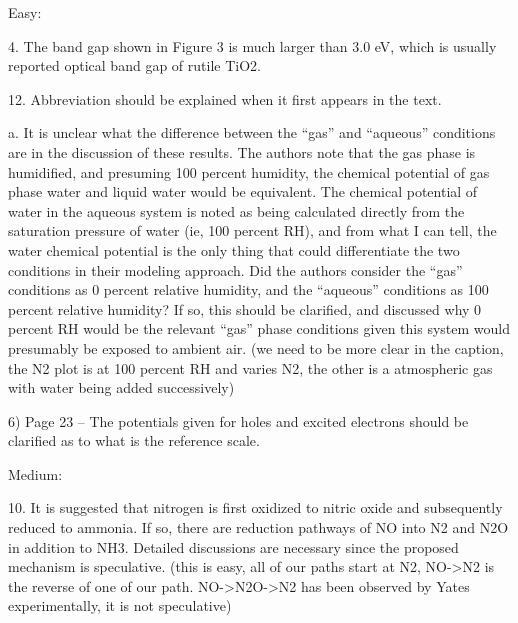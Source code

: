 Easy:

4. The band gap shown in Figure 3 is much larger than 3.0 eV, which is usually reported optical band gap of rutile TiO2. %

12. Abbreviation should be explained when it first appears in the text. %

a.      It is unclear what the difference between the “gas” and “aqueous” conditions are in the discussion of these results.  The authors note that the gas phase is humidified, and presuming 100 percent humidity, the chemical potential of gas phase water and liquid water would be equivalent. The chemical potential of water in the aqueous system is noted as being calculated directly from the saturation pressure of water (ie, 100 percent RH), and from what I can tell, the water chemical potential is the only thing that could differentiate the two conditions in their modeling approach.   Did the authors consider the “gas” conditions as 0 percent relative humidity, and the “aqueous” conditions as 100 percent relative humidity?  If so, this should be clarified, and discussed why 0 percent RH would be the relevant “gas” phase conditions given this system would presumably be exposed to ambient air. (we need to be more clear in the caption, the N2 plot is at 100 percent RH and varies N2, the other is a atmospheric gas with water being added successively) %



6)      Page 23 – The potentials given for holes and excited electrons should be clarified as to what is the reference scale. %

Medium:

10. It is suggested that nitrogen is first oxidized to nitric oxide and subsequently reduced to ammonia. If so, there are reduction pathways of NO into N2 and N2O in addition to NH3. Detailed discussions are necessary since the proposed mechanism is speculative. (this is easy, all of our paths start at N2, NO->N2 is the reverse of one of our path. NO->N2O->N2 has been observed by Yates experimentally, it is not speculative)

